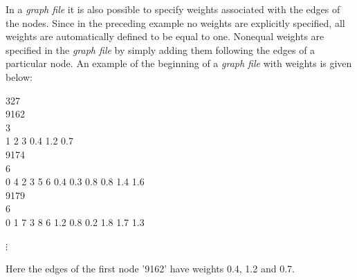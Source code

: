 In a {\em graph file} it is also possible to specify weights associated
with the edges of the nodes. Since in the preceding example no
weights are explicitly specified, all weights are automatically
defined to be equal to one. Nonequal weights are specified in the
{\em graph file} by simply adding them following the edges of a
particular node.
An example of the beginning of a {\em graph file} with weights is given below:

\footnotesize

327 \\
9162 \\
3 \\
1 2 3 0.4 1.2 0.7\\
9174 \\
6 \\
0 4 2 3 5 6 0.4 0.3 0.8 0.8 1.4 1.6\\
9179 \\
6 \\
0 1 7 3 8 6 1.2 0.8 0.2 1.8 1.7 1.3

\hspace{1cm} $\vdots$

\normalsize

\vspace{0.5cm}

Here the edges of the first node '9162' have weights 0.4, 1.2 and
0.7.\bigskip





